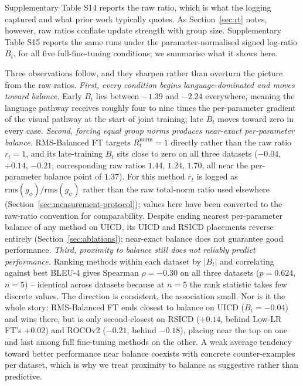 \documentclass[journal]{IEEEtran}
\begin{document}
Supplementary Table S14 reports the raw ratio, which is what the
logging captured and what prior work typically quotes. As
Section~\ref{sec:rt} notes, however, raw ratios conflate update
strength with group size. Supplementary Table S15 reports the same runs under the
parameter-normalised signed log-ratio $B_t$, for all five
full-fine-tuning conditions; we summarise what it shows here.



Three observations follow, and they sharpen rather than overturn
the picture from the raw ratios. \emph{First, every condition begins
language-dominated and moves toward balance.} Early $B_t$ lies
between $-1.39$ and $-2.24$ everywhere, meaning the language pathway
receives roughly four to nine times the per-parameter gradient of the
visual pathway at the start of joint training; late $B_t$ moves
toward zero in every case. \emph{Second, forcing equal group norms
produces near-exact per-parameter balance.} RMS-Balanced FT targets
$R_t^{\mathrm{norm}} = 1$ directly rather than the raw ratio
$r_t = 1$, and its late-training $B_t$ sits close to zero on all three
datasets ($-0.04$, $+0.14$, $-0.21$; corresponding raw ratios $1.44$,
$1.24$, $1.70$, all near the per-parameter balance point of $1.37$).
For this method $r_t$ is logged as
$\mathrm{rms}(g_\phi)/\mathrm{rms}(g_\psi)$ rather than the raw
total-norm ratio used elsewhere
(Section~\ref{sec:measurement-protocol}); values here have been
converted to the raw-ratio convention for comparability. Despite
ending nearest per-parameter balance of any method on UICD, its UICD
and RSICD placements reverse entirely
(Section~\ref{sec:ablations}); near-exact balance does not guarantee
good performance. \emph{Third, proximity to balance still does not reliably predict
performance.} Ranking methods within each dataset by
$\lvert B_t \rvert$ and correlating against best BLEU-4 gives
Spearman $\rho = -0.30$ on all three datasets ($p=0.624$, $n=5$) --
identical across datasets because at $n{=}5$ the rank statistic takes
few discrete values. The direction is consistent, the association
small. Nor is it the whole story: RMS-Balanced FT ends closest to
balance on UICD ($B_t = -0.04$) and wins there, but is only
second-closest on RSICD ($+0.14$, behind Low-LR FT's $+0.02$) and
ROCOv2 ($-0.21$, behind $-0.18$), placing near the top on one and last
among full fine-tuning methods on the other. A weak average tendency
toward better performance near balance coexists with concrete
counter-examples per dataset, which is why we treat proximity to
balance as suggestive rather than predictive.
\end{document}
